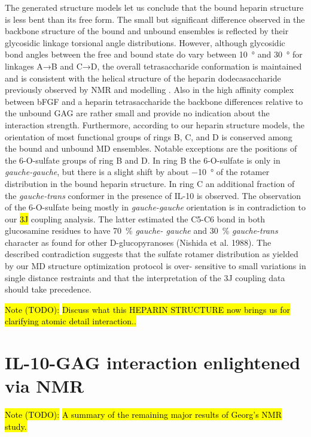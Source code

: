 The generated structure models let us conclude that the bound heparin structure
is less bent than its free form. The small but significant difference observed
in the backbone structure of the bound and unbound ensembles is reflected by
their glycosidic linkage torsional angle distributions. However, although
glycosidic bond angles between the free and bound state do vary between
\SI{10}{\degree} and \SI{30}{\degree} for linkages A→B and C→D, the overall
tetrasaccharide conformation is maintained and is consistent with the helical
structure of the heparin dodecasaccharide previously observed by NMR and
modelling \cite{foster_mulloy_1993}. Also in the high affinity complex between
bFGF and a heparin tetrasaccharide
\cite{faham_heparin_1996,mikhailov_hp_tetra_1996} the backbone differences
relative to the unbound GAG are rather small and provide no indication about the
interaction strength. Furthermore, according to our heparin structure models,
the orientation of most functional groups of rings B, C, and D is conserved
among the bound and unbound MD ensembles. Notable exceptions are the positions
of the 6-O-sulfate groups of ring B and D. In ring B the 6-O-sulfate is only in
\textit{gauche-gauche}, but there is a slight shift by about \SI{-10}{\degree}
of the rotamer distribution in the bound heparin structure. In ring C an
additional fraction of the \textit {gauche-trans} conformer in the presence of
IL-10 is observed. The observation of the 6-O-sulfate being mostly in \textit
{gauche-gauche} orientation is in contradiction to our \hl{3J} coupling
analysis. The latter estimated the C5-C6 bond in both glucosamine residues to
have \SI{70}{\percent} \textit{gauche- gauche} and \SI{30}{\percent} \textit
{gauche-trans} character as found for other D-glucopyranoses (Nishida et al.
1988). The described contradiction suggests that the sulfate rotamer
distribution as yielded by our MD structure optimization protocol is over-
sensitive to small variations in single distance restraints and that the
interpretation of the 3J coupling data should take precedence.

\hl{Note (TODO):}
\hl{Discuss what this HEPARIN STRUCTURE now brings us for clarifying atomic
detail interaction..}


\section{IL-10-GAG interaction enlightened via NMR}
\hl{Note (TODO):}
\hl{A summary of the remaining major results of Georg's NMR study.}



